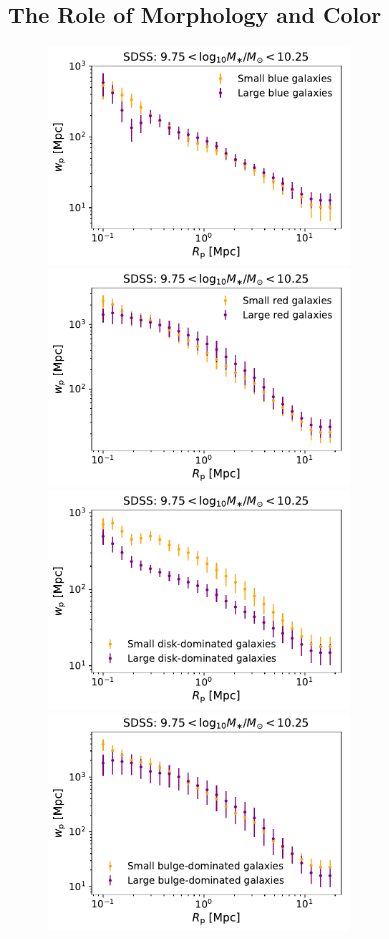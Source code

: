 \documentclass[usenatbib,usegraphicx,letterpaper]{mn2e}
\begin{document}
\subsection{The Role of Morphology and Color}
\label{subsec:colormorph}

\begin{figure}
\centering
\includegraphics[width=8cm]{FIGS/blue_sdss_size_dependent_clustering_9p75_to_10p25.pdf}
\includegraphics[width=8cm]{FIGS/red_sdss_size_dependent_clustering_9p75_to_10p25.pdf}
\includegraphics[width=8cm]{FIGS/disk_sdss_size_dependent_clustering_9p75_to_10p25.pdf}
\includegraphics[width=8cm]{FIGS/bulge_sdss_size_dependent_clustering_9p75_to_10p25.pdf}

\end{figure}
\end{document}
